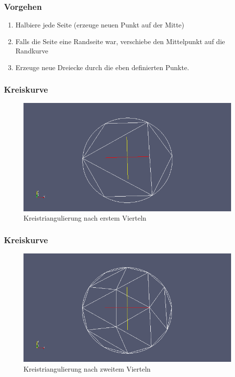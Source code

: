 \documentclass{beamer}
\begin{document}
\begin{frame}
	\frametitle{Vorgehen}

	\begin{enumerate}[1.]
		\item
			Halbiere jede Seite (erzeuge neuen Punkt auf der Mitte)
		\item
			Falls die Seite eine Randseite war, verschiebe den Mittelpunkt auf die Randkurve
		\item
			Erzeuge neue Dreiecke durch die eben definierten Punkte.
	\end{enumerate}
\end{frame}

\begin{frame}
	\frametitle{Kreiskurve}

	\begin{figure}
		\caption{Kreistriangulierung nach erstem Vierteln}
		\includegraphics[width=0.8 \linewidth]{kreis1.png}
	\end{figure}
\end{frame}

\begin{frame}
	\frametitle{Kreiskurve}

	\begin{figure}
		\caption{Kreistriangulierung nach zweitem Vierteln}
		\includegraphics[width=0.8 \linewidth]{kreis2.png}
	\end{figure}
\end{frame}
\end{document}

